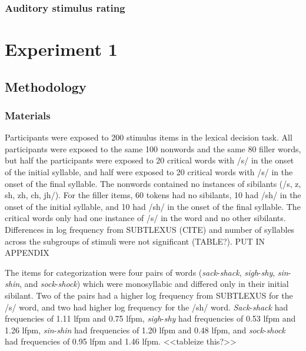\subsubsection{Auditory stimulus rating}


\section{Experiment 1}

\subsection{Methodology}

\subsubsection{Materials}


Participants were exposed to 200 stimulus items in the lexical decision task.  All participants were exposed to the same 100 nonwords and the same 80 filler words, but half the participants were exposed to 20 critical words with /s/ in the onset of the initial syllable, and half were exposed to 20 critical words with /s/ in the onset of the final syllable.  The nonwords contained no instances of sibilants (/s, z, sh, zh, ch, jh/).  For the filler items, 60 tokens had no sibilants, 10 had /sh/ in the onset of the initial syllable, and 10 had /sh/ in the onset of the final syllable.  The critical words only had one instance of /s/ in the word and no other sibilants.  Differences in log frequency from SUBTLEXUS (CITE) and number of syllables across the subgroups of stimuli were not significant (TABLE?). PUT IN APPENDIX



The items for categorization were four pairs of words (\emph{sack}-\emph{shack}, \emph{sigh}-\emph{shy}, \emph{sin}-\emph{shin}, and \emph{sock}-\emph{shock}) which were monosyllabic and differed only in their initial sibilant.  Two of the pairs had a higher log frequency from SUBTLEXUS for the /s/ word, and two had higher log frequency for the /sh/ word.  \emph{Sack}-\emph{shack} had frequencies of 1.11 lfpm and 0.75 lfpm, \emph{sigh}-\emph{shy} had frequencies of 0.53 lfpm and 1.26 lfpm, \emph{sin}-\emph{shin} had frequencies of 1.20 lfpm and 0.48 lfpm, and \emph{sock}-\emph{shock} had frequencies of 0.95 lfpm and 1.46 lfpm. <<tableize this?>>
	

